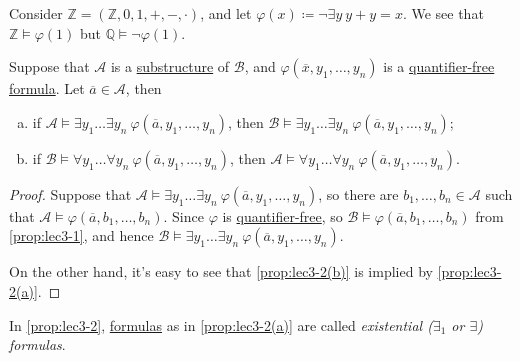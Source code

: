 \begin{eg}
	Consider \(\mathbb{Z} =(\mathbb{Z} , 0, 1, +, -, \cdot)\), and let \(\varphi (x)\coloneqq \lnot \exists y\ y + y = x\). We see that \(\mathbb{Z} \models \varphi (1)\) but \(\mathbb{Q} \models \lnot \varphi (1)\).
\end{eg}

\begin{proposition}\label{prop:lec3-2}
	Suppose that \(\mathcal{A} \) is a \hyperref[def:substructure]{substructure} of \(\mathcal{B} \), and \(\varphi (\overline{x}, y_1, \ldots , y_n )\) is a \hyperref[not:quantifier-free]{quantifier-free} \hyperref[def:formula]{formula}. Let \(\overline{a} \in \mathcal{A} \), then
	\begin{enumerate}[(a)]
		\item\label{prop:lec3-2(a)} if \(\mathcal{A} \models \exists y_1 \ldots \exists y_n\ \varphi (\overline{a} , y_1, \ldots , y_n)\), then \(\mathcal{B} \models \exists y_1\ldots \exists y_n\ \varphi (\overline{a} , y_1, \ldots , y_n)\);
		\item\label{prop:lec3-2(b)} if \(\mathcal{B} \models \forall y_1 \ldots \forall y_n\ \varphi (\overline{a} , y_1, \ldots , y_n)\), then \(\mathcal{A} \models \forall y_1 \ldots \forall y_n\ \varphi (\overline{a} , y_1, \ldots , y_n)\).
	\end{enumerate}
\end{proposition}
\begin{proof}
	Suppose that \(\mathcal{A} \models \exists y_1 \ldots \exists y_n\ \varphi (\overline{a} , y_1, \ldots , y_n)\), so there are \(b_1, \ldots , b_n \in \mathcal{A} \) such that \(\mathcal{A} \models \varphi (\overline{a} , b_1, \ldots , b_n)\). Since \(\varphi \) is \hyperref[not:quantifier-free]{quantifier-free}, so \(\mathcal{B} \models \varphi (\overline{a} , b_1, \ldots , b_n)\) from \autoref{prop:lec3-1}, and hence \(\mathcal{B} \models \exists y_1 \ldots \exists y_n \ \varphi (\overline{a} , y_1, \ldots , y_n)\).

	On the other hand, it's easy to see that \autoref{prop:lec3-2(b)} is implied by \autoref{prop:lec3-2(a)}.
\end{proof}

\begin{notation}[Existential]\label{not:existential}
	In \autoref{prop:lec3-2}, \hyperref[def:formula]{formulas} as in \autoref{prop:lec3-2(a)} are called \emph{existential (\(\exists _1\) or \(\exists \)) formulas}.
\end{notation}

